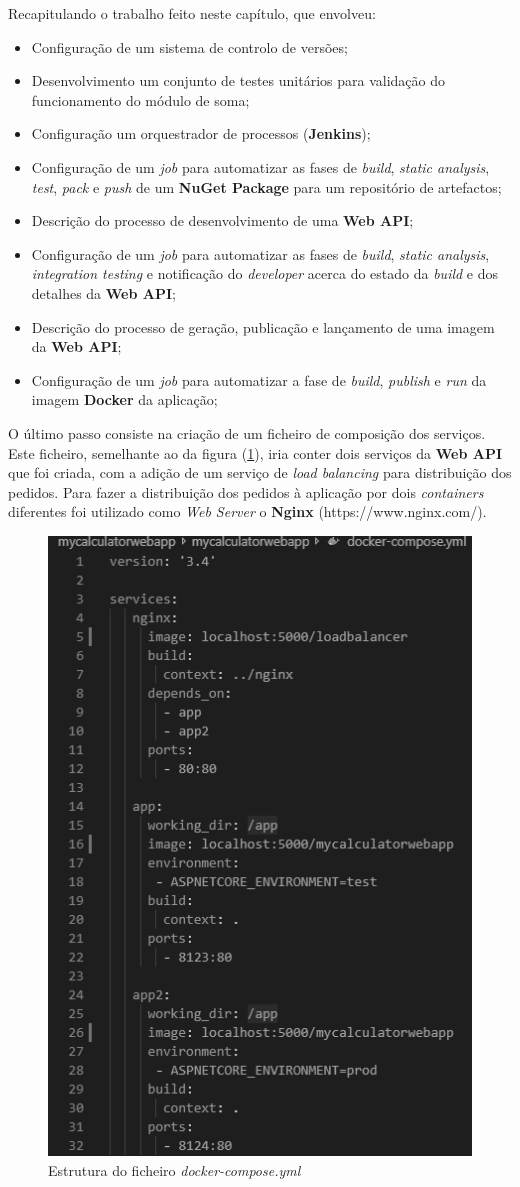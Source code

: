 \hspace{1cm}Recapitulando o trabalho feito neste capítulo, que envolveu:

\begin{itemize}
 \item Configuração de um sistema de controlo de versões;
 \item Desenvolvimento um conjunto de testes unitários para validação do funcionamento do módulo de soma;
 \item Configuração um orquestrador de processos (\textbf{Jenkins});
 \item Configuração de um \textit{job} para automatizar as fases de \textit{build}, \textit{static analysis}, \textit{test}, \textit{pack} e \textit{push} de um \textbf{NuGet Package} para um repositório de artefactos;
 \item Descrição do processo de desenvolvimento de uma \textbf{Web API};
 \item Configuração de um \textit{job} para automatizar as fases de \textit{build}, \textit{static analysis}, \textit{integration testing} e notificação do \textit{developer} acerca do estado da \textit{build} e dos detalhes da \textbf{Web API};
 \item Descrição do processo de geração, publicação e lançamento de uma imagem da \textbf{Web API};
 \item Configuração de um \textit{job} para automatizar a fase de \textit{build}, \textit{publish} e \textit{run} da imagem \textbf{Docker} da aplicação;
\end{itemize}

\hspace{1cm}O último passo consiste na criação de um ficheiro de composição dos serviços. Este ficheiro, semelhante ao da figura (\ref{Fig:Fig96}), iria conter dois serviços da \textbf{Web API} que foi criada, com a adição de um serviço de \textit{load balancing} para distribuição dos pedidos. Para fazer a distribuição dos pedidos à aplicação por dois \textit{containers} diferentes foi utilizado como \textit{Web Server} o \textbf{Nginx} (https://www.nginx.com/).

\begin{figure}[hbt!]
\centering
\includegraphics[width=0.43\linewidth]{Cap5/DockerComposeCalculator.png}
\caption{Estrutura do ficheiro \textit{docker-compose.yml}}
\label{Fig:Fig96}
\end{figure}

